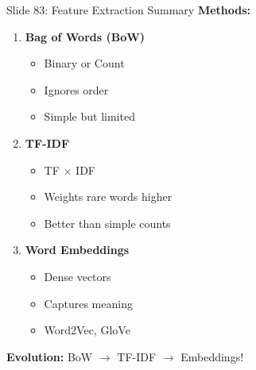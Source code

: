 \documentclass[8pt]{beamer}
\begin{document}
	\begin{frame}{Slide 83: Feature Extraction Summary}
		\fontsize{6.5}{7.5}\selectfont
		\textbf{Methods:}
		\begin{enumerate}
			\item \textbf{Bag of Words (BoW)}
			\begin{itemize}
				\item Binary or Count
				\item Ignores order
				\item Simple but limited
			\end{itemize}
			\item \textbf{TF-IDF}
			\begin{itemize}
				\item TF $\times$ IDF
				\item Weights rare words higher
				\item Better than simple counts
			\end{itemize}
			\item \textbf{Word Embeddings}
			\begin{itemize}
				\item Dense vectors
				\item Captures meaning
				\item Word2Vec, GloVe
			\end{itemize}
		\end{enumerate}
		
		\textcolor{myblue}{\textbf{Evolution:}} BoW $\to$ TF-IDF $\to$ Embeddings!
	\end{frame}
	
\end{document}
